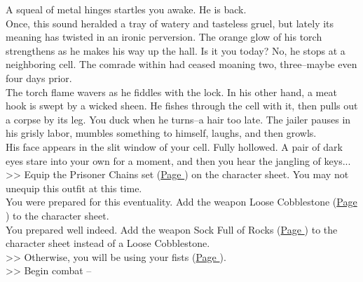 A squeal of metal hinges startles you awake. He is back.\\

Once, this sound heralded a tray of watery and tasteless gruel, but lately its meaning has twisted in an ironic perversion. The orange glow of his torch strengthens as he makes his way up the hall. Is it you today? No, he stops at a neighboring cell. The comrade within had ceased moaning two, three--maybe even four days prior.\\

The torch flame wavers as he fiddles with the lock. In his other hand, a meat hook is swept by a wicked sheen. He fishes through the cell with it, then pulls out a corpse by its leg. You duck when he turns--a hair too late. The jailer pauses in his grisly labor, mumbles something to himself, laughs, and then growls.\\

His face appears in the slit window of your cell. Fully hollowed. A pair of dark eyes stare into your own for a moment, and then you hear the jangling of keys...\\

>> Equip the Prisoner Chains set (\hyperlink{Prisoner Chains}{Page \pageref*{Prisoner Chains}}) on the character sheet. You may not unequip this outfit at this time.\\
 You were prepared for this eventuality. Add the weapon Loose Cobblestone (\hyperlink{Loose Cobblestone}{Page \pageref*{Loose Cobblestone}}) to the character sheet.\\
 You prepared well indeed. Add the weapon Sock Full of Rocks (\hyperlink{Sock Full of Rocks}{Page \pageref*{Sock Full of Rocks}}) to the character sheet instead of a Loose Cobblestone.\\
>> Otherwise, you will be using your fists (\hyperlink{Fist}{Page \pageref*{Fist}}).\\

>> Begin combat -- 